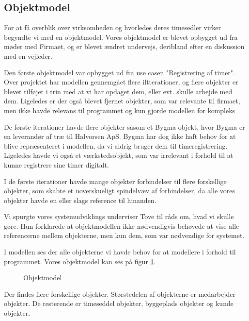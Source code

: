 \subsection{Objektmodel}

For at få overblik over virksomheden og hvorledes deres timesedler virker begyndte vi med en objektmodel.
Vores objektmodel er blevet opbygget ud fra møder med Firmaet, og er blevet ændret undervejs, deribland efter en diskussion med en vejleder.

Den første objektmodel var opbygget ud fra use casen "Registrering af timer".
Over projektet har modellen gennemgået flere iltterationer, og flere objekter er blevet tilføjet i trin med at vi har opdaget dem, eller evt. skulle arbejde med dem.
Ligeledes er der også blevet fjernet objekter, som var relevante til firmaet, men ikke havde relevans til programmet og kun gjorde modellen for kompleks

De første iterationer havde flere objekter såsom et Bygma objekt, hvor Bygma er en leverandør af træ til Halvorsen ApS. Bygma har dog ikke haft behov for at blive repræsenteret i modellen, da vi aldrig bruger dem til timeregistrering.
Ligeledes havde vi også et værkstedsobjekt, som var irrelevant i forhold til at kunne registrere sine timer digitalt.

I de første iterationer havde mange objekter forbindelser til flere forskellige objekter, som skabte et uoverskueligt spindelvæv af forbindelser, da alle vores objekter havde en eller slags reference til hinanden. 

Vi spurgte vores systemudviklings underviser Tove til råds om, hvad vi skulle gøre. Hun forklarede at objektmodellen ikke nødvendigvis behøvede at vise alle referencerne mellem objekterne, men kun dem, som var nødvendige for systemet.

I modellen ses der alle objekterne vi havde behov for at modellere i forhold til programmet. Vores objektmodel kan ses på figur \ref{fig:Objektmodel}.

\begin{figure}[H]
    \caption{Objektmodel}
    \label{fig:Objektmodel}
\end{figure}

Der findes flere forskellige objekter. Størstedelen af objekterne er medarbejder objekter. De resterende er timeseddel objekter, byggeplads objekter og kunde objekter. 